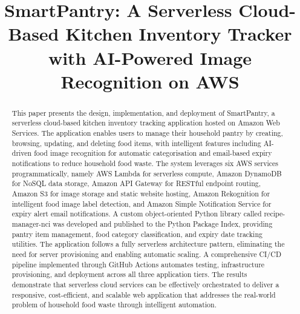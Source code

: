 \documentclass[conference]{IEEEtran}
\begin{document}
\title{SmartPantry: A Serverless Cloud-Based Kitchen Inventory Tracker with AI-Powered Image Recognition on AWS}

\author{
}

\maketitle

\begin{abstract}
This paper presents the design, implementation, and deployment of SmartPantry, a serverless cloud-based kitchen inventory tracking application hosted on Amazon Web Services. The application enables users to manage their household pantry by creating, browsing, updating, and deleting food items, with intelligent features including AI-driven food image recognition for automatic categorisation and email-based expiry notifications to reduce household food waste. The system leverages six AWS services programmatically, namely AWS Lambda for serverless compute, Amazon DynamoDB for NoSQL data storage, Amazon API Gateway for RESTful endpoint routing, Amazon S3 for image storage and static website hosting, Amazon Rekognition for intelligent food image label detection, and Amazon Simple Notification Service for expiry alert email notifications. A custom object-oriented Python library called recipe-manager-nci was developed and published to the Python Package Index, providing pantry item management, food category classification, and expiry date tracking utilities. The application follows a fully serverless architecture pattern, eliminating the need for server provisioning and enabling automatic scaling. A comprehensive CI/CD pipeline implemented through GitHub Actions automates testing, infrastructure provisioning, and deployment across all three application tiers. The results demonstrate that serverless cloud services can be effectively orchestrated to deliver a responsive, cost-efficient, and scalable web application that addresses the real-world problem of household food waste through intelligent automation.
\end{abstract}
\end{document}
